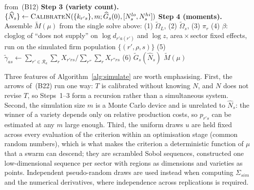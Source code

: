 \begin{algorithm}[H]
\begin{algorithmic}[1]
  from~(B12)
\vspace{2pt}
\State \textbf{Step 3 (variety count).}
  $\{\widehat{N}_s\}\gets\Call{CalibrateN}{\{k_{r's}\},m;\widehat{G}_s(0),[N^{lo}_s,N^{hi}_s]}$
\vspace{2pt}
\State \textbf{Step 4 (moments).} Assemble $\widetilde{M}(\mu)$ from the single
  solve above:
\State \quad (1) $\widetilde{\Omega}_L$, (2) $\widetilde{\Omega}_s$, (3) $\pi_r$
\State \quad (4) $\beta$: cloglog of ``does not supply'' on $\log d_{r'a(r')}$ and
  $\log z$, area${}\times{}$sector fixed effects, run on the simulated firm
  population $\{(r',\rho,s)\}$
\State \quad (5) $\widetilde{\gamma}_{as}\gets\sum_{r'\in\mathcal{R}_a}\sum_r X_{r'rs}\big/\sum_{r''}\sum_r X_{r''rs}$
\State \quad (6) $\widetilde{G}_s(\widehat{N}_s)$
\State \Return $\widetilde{M}(\mu)$
\end{algorithmic}
\end{algorithm}

Three features of Algorithm~\ref{alg:simulate} are worth emphasising. First, the
arrows of~(B22) run one way: $T$ is calibrated without knowing
$N$, and $N$ does not revise $T$, so Steps~1--3 form a recursion rather
than a simultaneous system. Second, the simulation size $m$ is a Monte Carlo
device and is unrelated to $\widehat{N}_s$: the winner of a variety depends only
on relative production costs, so $p_{r's}$ can be estimated at any $m$ large
enough. Third, the uniform draws $u$ are held fixed across every evaluation of
the criterion within an optimisation stage (common random numbers), which is
what makes the criterion a deterministic function of $\mu$ that a swarm can
descend; they are scrambled Sobol sequences, constructed one low-dimensional
sequence per sector with regions as dimensions and varieties as points.
Independent pseudo-random draws are used instead when computing $\Sigma_{sim}$
and the numerical derivatives, where independence across replications is
required.

